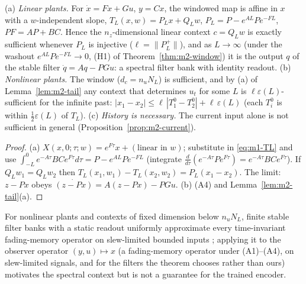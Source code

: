 \begin{proposition}\label{prop:m1-suff}
(a) \emph{Linear plants.} For $\dot x=Fx+Gu$, $y=Cx$, the windowed map is affine in $x$ with a
$w$-independent slope, $T_L(x,w)=P_Lx+Q_Lw$, $P_L=P-e^{AL}Pe^{-FL}$, $PF=AP+BC$. Hence the $n_z$-dimensional linear
context $c=Q_Lw$ is exactly sufficient whenever $P_L$ is injective ($\ell=\|P_L^+\|$), and as $L\to\infty$ (under the
washout $e^{AL}Pe^{-FL}\to0$, (H1) of Theorem~\ref{thm:m2-window}) it is the
output $q$ of the stable filter $\dot q=Aq-PGu$: a spectral filter bank with identity readout.
(b) \emph{Nonlinear plants.} The window ($d_c=n_uN_L$) is sufficient, and by (a) of Lemma~\ref{lem:m2-tail}
any context that determines $u_t$ for some $L$ is $\ell\varepsilon(L)$-sufficient for the infinite past:
$|x_1-x_2|\le\ell\,|T^0_1-T^0_2|+\ell\,\varepsilon(L)$ (each $T^0_i$ is within $\tfrac12\varepsilon(L)$ of $T_L$).
(c) \emph{History is necessary.} The current input alone is not sufficient in general
(Proposition~\ref{prop:m2-current}).
\end{proposition}
\begin{proof}
(a) $X(x,0;\tau;w)=e^{F\tau}x+(\text{linear in }w)$; substitute in \eqref{eq:m1-TL} and use
$\int_{-L}^0e^{-A\tau}BCe^{F\tau}d\tau=P-e^{AL}Pe^{-FL}$ (integrate $\tfrac{d}{d\tau}(e^{-A\tau}Pe^{F\tau})=e^{-A\tau}BCe^{F\tau}$).
If $Q_Lw_1=Q_Lw_2$ then $T_L(x_1,w_1)-T_L(x_2,w_2)=P_L(x_1-x_2)$. The limit: $z-Px$ obeys $\dot{(z-Px)}=A(z-Px)-PGu$.
(b) (A4) and Lemma~\ref{lem:m2-tail}(a).
\end{proof}
\noindent For nonlinear plants and contexts of fixed dimension below $n_uN_L$, finite stable filter banks with a
static readout uniformly approximate every time-invariant fading-memory operator on slew-limited bounded inputs
\citep[Theorem~2]{boyd1985fading}; applying it to the observer operator $(y,u)\mapsto x$ (a fading-memory operator
under (A1)--(A4), on slew-limited signals, and for the filters the theorem chooses rather than ours) motivates the
spectral context but is not a guarantee for the trained encoder.

